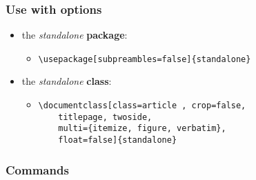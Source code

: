 \documentclass[class=article , crop=false, titlepage, twoside, multi={itemize, figure, verbatim}, float=false]{standalone}
\begin{document}
\subsubsection[Use with Options]{\Large Use with options}
\begin{itemize}


\item the \emph{standalone} \textbf{package}:
\begin{itemize}
\item \begin{verbatim}\usepackage[subpreambles=false]{standalone}
\end{verbatim}
\end{itemize}

\item the \emph{standalone} \textbf{class}:
\begin{itemize}
\item \begin{verbatim}
\documentclass[class=article , crop=false, 
    titlepage, twoside, 
    multi={itemize, figure, verbatim}, 
    float=false]{standalone}
\end{verbatim}

\end{itemize}

\end{itemize}

\subsubsection[Commands]{\Large Commands}
\end{document}

